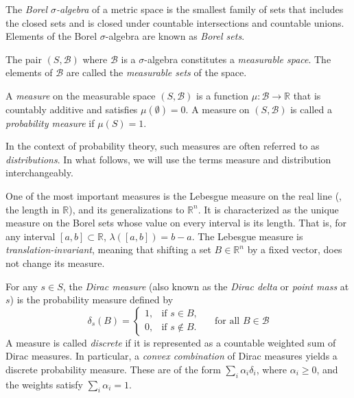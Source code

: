 \begin{definition}
  The \emph{Borel $\sigma$-algebra} of a metric space is the smallest family
 of sets that includes  the closed sets and is closed under countable intersections and countable unions. Elements of the Borel
 $\sigma$-algebra are known as \emph{Borel sets}. 
\end{definition}

\begin{definition} 
  The pair $(S, \mathcal{B})$ where $\mathcal{B}$ is a $\sigma$-algebra constitutes a \emph{measurable space}. The elements of $\mathcal{B}$ are called  the \emph{measurable sets} of the space. 
\end{definition}



\begin{definition} 
  A  \emph{measure} on the measurable space $(S,\mathcal{B})$ is a function $\mu: \mathcal{B} \to  \mathbb{R} $ that is countably additive and satisfies $\mu(\emptyset)=0$. A measure  on $(S,\mathcal{B})$ is called a \emph{probability measure} if $\mu(S) = 1$.
\end{definition}

 In the context of probability theory, such measures are often referred to as \emph{distributions}. In what follows, we will use the terms measure and distribution interchangeably.

 

 One of the most important measures is the Lebesgue measure on the real line (\ie, the length in $\mathbb{R}$), and its generalizations to $\mathbb{R}^n$.  It is characterized as the unique measure on the Borel sets whose value on every interval is its length. That is, for any interval $[a, b] \subset \mathbb{R}$,
$
\lambda([a, b]) = b - a.$ The Lebesgue measure is \emph{translation-invariant}, meaning that shifting a set $B \in \mathbb{R}^n$ by a fixed vector, does not change its measure.

For any $ s \in S $, the \emph{Dirac measure} (also known as the \emph{Dirac delta} or \emph{point mass} at \( s \)) is the probability measure defined by
$$
\delta_s(B) =
\begin{cases}
1, & \text{if } s \in B, \\
0, & \text{if } s \notin B.
\end{cases} \quad \text{ for all } B \in \mathcal{B}
$$
A measure is called \emph{discrete} if it is represented as a countable weighted sum of Dirac measures. In particular, a \emph{convex combination} of Dirac measures yields a discrete probability measure. These are of the form $\sum_{i} \alpha_i \delta_i$,
where $ \alpha_i \geq 0 $, and the weights satisfy $ \sum_{i} \alpha_i = 1 $.

